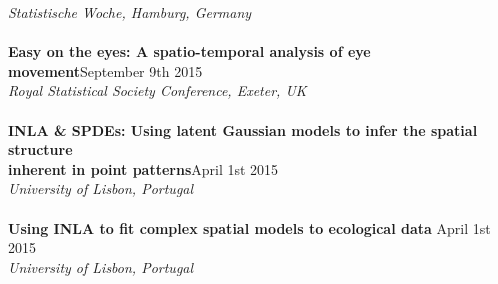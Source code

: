 \documentclass[10pt,letter]{article}
\begin{document}
                                                   {\sl Statistische Woche, Hamburg, Germany}\\
                                                   \hdashrule[0.5ex]{4cm}{1pt}{1pt}\\
                                                   \textbf{Easy on the eyes: A spatio-temporal analysis of eye movement}\hfill September 9th 2015\\
                                                          {\sl Royal Statistical Society Conference, Exeter, UK}\\
                                                          \hdashrule[0.5ex]{4cm}{1pt}{1pt}\\
                                                          \textbf{INLA \& SPDEs: 
                                                            Using latent Gaussian models to infer the spatial structure \\
                                                            inherent in point patterns}\hfill April 1st 2015\\
                                                                 {\sl University of Lisbon, Portugal}\\
                                                                 \hdashrule[0.5ex]{4cm}{1pt}{1pt}\\
                                                                 \textbf{Using INLA to fit complex spatial models to ecological data } \hfill April 1st 2015\\
                                                                        {\sl University of Lisbon, Portugal}\\

\end{document}

